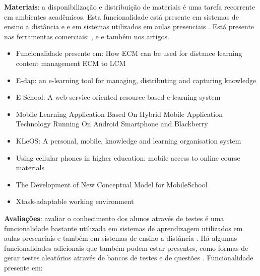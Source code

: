 \textbf{Materiais}: a disponibilização e distribuição de materiais é uma tarefa recorrente em ambientes acadêmicos. Esta funcionalidade está presente em sistemas de ensino a distância  e   e em sistemas utilizados em aulas presenciais \cite{mermelstein_using_2005}. Está presente nas ferramentas comerciais: ,  e  e também nos artigos.

\vspace{-5mm}
\begin{itemize}
    \item Funcionalidade presente em: How ECM can be used for distance learning content management ECM to LCM \cite{daoudi_how_2012}
    \item E-dap: an e-learning tool for managing, distributing and capturing knowledge \cite{bonastre_e-dap:_2005}
    \item E-School: A web-service oriented resource based e-learning system \cite{sultana_e-school:_2010}
    \item Mobile Learning Application Based On Hybrid Mobile Application Technology Running On Android Smartphone and Blackberry \cite{setiabudi_mobile_2013}
    \item KLeOS: A personal, mobile, knowledge and learning organisation system \cite{vavoula_kleos:_2002}
    \item Using cellular phones in higher education: mobile access to online course materials \cite{mermelstein_using_2005}
    \item The Development of New Conceptual Model for MobileSchool \cite{hashim_development_2012}
    \item Xtask-adaptable working environment \cite{ketamo_xtask-adaptable_2002}
\end{itemize}

\textbf{Avaliações}: avaliar o conhecimento dos alunos através de testes é uma funcionalidade bastante utilizada em sistemas de aprendizagem utilizados em aulas presenciais \cite{fardoun_instructional_2010} e também em sistemas de ensino a distância \cite{bonastre_e-dap:_2005}. Há algumas funcionalidades adicionais que também podem estar presentes, como formas de gerar testes aleatórios através de bancos de testes e de questões \cite{fardoun_instructional_2010}. Funcionalidade presente em: 


